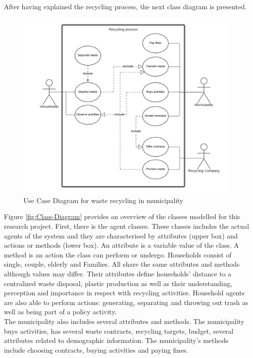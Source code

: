 \noindent After having explained the recycling process, the next class diagram is presented.




\begin{figure}[H]
    \centering
        \captionsetup{width=\linewidth}
        \includegraphics[width=0.95\linewidth]{Images/UML for recycling system - Use case (5).png}
        \caption{Use Case Diagram for waste recycling in municipality}
    \label{fig:Waste_Use_Case}
\end{figure}

\noindent Figure \ref{fig:Class-Diagram} provides an overview of the classes modelled for this research project. First, there is the agent classes. These classes includes the actual agents of the system and they are characterised by attributes (upper box) and actions or methods (lower box). An attribute is a variable value of the class. A method is an action the class can perform or undergo. Households consist of single, couple, elderly and Families. All share the same attributes and methods although values may differ. Their attributes define households' distance to a centralized waste disposal,  plastic production as well as their understanding, perception and importance in respect with recycling activities. Household agents are also able to perform actions: generating, separating and throwing out trash as well as being part of a policy activity.\\

\noindent The municipality also includes several attributes and methods. The municipality buys activities, has several waste contracts, recycling targets, budget, several attributes related to demographic information. 
The municipality's methods include choosing contracts, buying activities and paying fines.\\

